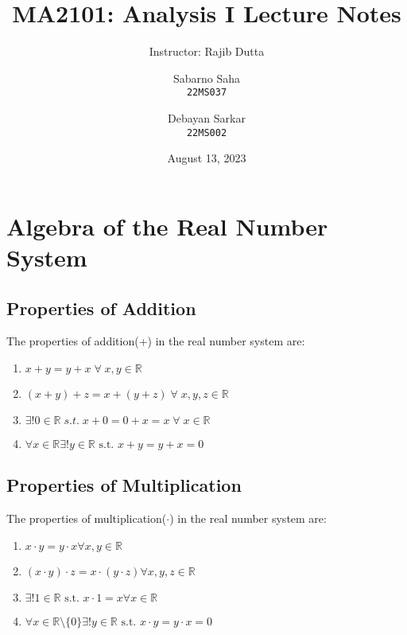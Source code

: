 \documentclass{scrartcl}
\begin{document}
\newcommand{\rn}{\mathbb{R}}
\newcommand{\nn}{\mathbb{N}}
\newcommand{\q}{\mathbb{Q}}
\newcommand{\p}{\mathcal{P}}
\newcommand{\z}{\mathbb{Z}}
\newtheorem*{remark}{Remark}
\theoremstyle{definition}
\newtheorem{definition}{Definition}[section]
\newtheorem{theorem}{Theorem}[section]
\theoremstyle{definition}
\newtheorem{example}{Example}[section]

\title{MA2101: Analysis I Lecture Notes}
\subtitle{Instructor: Rajib Dutta}
\author{Sabarno Saha \\ \texttt{22MS037}\and Debayan Sarkar \\ \texttt{22MS002}}
\date{August 13, 2023}
    \maketitle
    \section{Algebra of the Real Number System}
    \subsection{Properties of Addition}
    The properties of addition(+) in the real number system are:
    \begin{enumerate}[label={(A\arabic*})]
        \item $x+y=y+x\; \forall \; x,y \in \mathbb{R}$
        \item $(x+y)+z = x+(y+z) \; \forall \; x,y,z \in \mathbb{R}$
        \item $ \exists !0 \in \mathbb{R} \; s.t.\; x+0 =0+x =x \; \forall \; x\in \mathbb{R}$
        \item $ \forall x \in \rn \exists! y \in \rn \text{ s.t. } x + y = y + x = 0$
    \end{enumerate}
    \subsection{Properties of Multiplication}
    The properties of multiplication($\cdot$) in the real number system are:
    \begin{enumerate}[label={(M\arabic*)}]
        \item $x\cdot y = y\cdot x \forall x, y \in \rn$ 
        \item $(x \cdot y)\cdot z = x\cdot (y \cdot z) \forall x, y, z \in \rn$
        \item $\exists ! 1 \in \rn \text{ s.t. } x \cdot 1 = x \forall x \in \rn$
        \item $\forall x\in \rn \setminus \{0\} \exists ! y \in \rn \text{ s.t. } x\cdot y = y \cdot x = 0$
    \end{enumerate}
\end{document}
